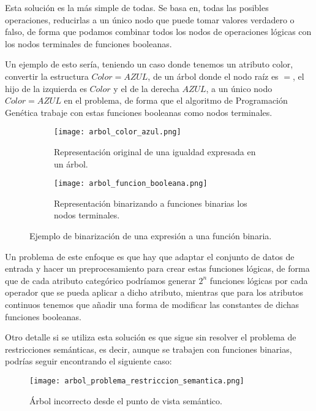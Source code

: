Esta solución es la más simple de todas. Se basa en, todas las posibles operaciones, reducirlas a un único nodo que puede tomar valores verdadero o falso, de forma que podamos combinar todos los nodos de operaciones lógicas con los nodos terminales de funciones booleanas.

Un ejemplo de esto sería, teniendo un caso donde tenemos un atributo color, convertir la estructura $Color = AZUL$, de un árbol donde el nodo raíz es $=$, el hijo de la izquierda es $Color$ y el de la derecha $AZUL$, a un único nodo $Color = AZUL$ en el problema, de forma que el algoritmo de Programación Genética trabaje con estas funciones booleanas como nodos terminales.

\begin{figure}[H]
    \centering
	 \begin{subfigure}[b]{0.49\textwidth}
		 \centering
		 \texttt{[image: arbol\_color\_azul.png]}
		 \caption{Representación original de una igualdad expresada en un árbol.}
		 \label{fig:arbol_color_azul}
	 \end{subfigure}
	 \begin{subfigure}[b]{0.49\textwidth}
		 \centering
		\texttt{[image: arbol\_funcion\_booleana.png]}
		\caption{Representación binarizando a funciones binarias los nodos terminales.}
		\label{fig:arbol_funcion_booleana}
   \end{subfigure}
	\caption{Ejemplo de binarización de una expresión a una función binaria.}
	\label{fig:arbol_exp_a_funcion_booleana}
\end{figure}


Un problema de este enfoque es que hay que adaptar el conjunto de datos de entrada y hacer un preprocesamiento para crear estas funciones lógicas, de forma que de cada atributo categórico podríamos generar $2^n$ funciones lógicas por cada operador que se pueda aplicar a dicho atributo, mientras que para los atributos continuos tenemos que añadir una forma de modificar las constantes de dichas funciones booleanas.

Otro detalle si se utiliza esta solución es que sigue sin resolver el problema de restricciones semánticas, es decir, aunque se trabajen con funciones binarias, podrías seguir encontrando el siguiente caso:

\begin{figure}[H]
    \centering
	  \texttt{[image: arbol\_problema\_restriccion\_semantica.png]}
    \caption{Árbol incorrecto desde el punto de vista semántico.}
	 \label{fig:arbol_problema_restriccion_semantica}
\end{figure}

